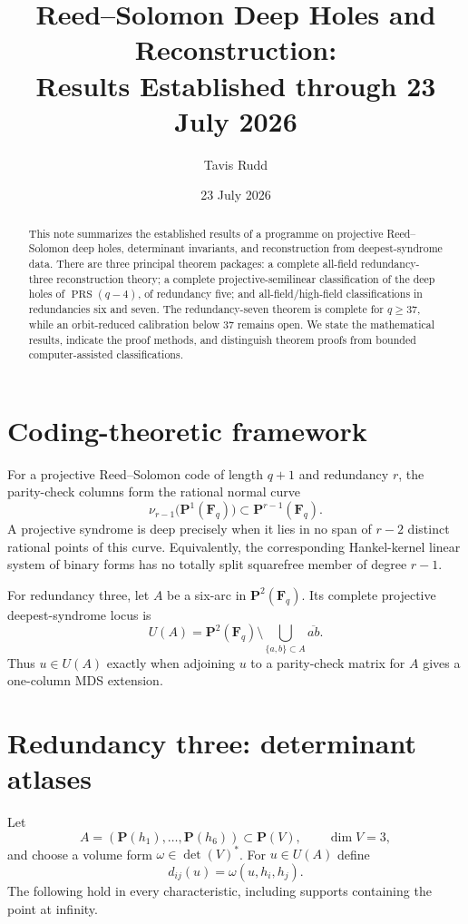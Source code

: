 \documentclass[11pt]{article}
\title{Reed--Solomon Deep Holes and Reconstruction:\\
Results Established through 23 July 2026}
\author{Tavis Rudd}
\date{23 July 2026}
\newcommand{\F}{\mathbf F}
\newcommand{\PRS}{\operatorname{PRS}}
\begin{document}
\maketitle

\begin{abstract}
This note summarizes the established results of a programme on projective
Reed--Solomon deep holes, determinant invariants, and reconstruction from deepest-syndrome
data.  There are three principal theorem packages: a complete all-field
redundancy-three reconstruction theory; a complete projective-semilinear
classification of the deep holes of $\PRS(q-4)$, of redundancy five; and
all-field/high-field classifications in redundancies six and seven.  The
redundancy-seven theorem is complete for $q\geq37$, while an orbit-reduced
calibration below $37$ remains open.  We state the mathematical results,
indicate the proof methods, and distinguish theorem proofs from bounded
computer-assisted classifications.
\end{abstract}

\section{Coding-theoretic framework}

For a projective Reed--Solomon code of length $q+1$ and redundancy $r$, the
parity-check columns form the rational normal curve
\[
 \nu_{r-1}\bigl(\mathbf P^1(\F_q)\bigr)
 \subset \mathbf P^{r-1}(\F_q).
\]
A projective syndrome is deep precisely when it lies in no span of $r-2$
distinct rational points of this curve.  Equivalently, the corresponding
Hankel-kernel linear system of binary forms has no totally split squarefree
member of degree $r-1$.

For redundancy three, let $A$ be a six-arc in $\mathbf P^2(\F_q)$.  Its
complete projective deepest-syndrome locus is
\[
 U(A)=\mathbf P^2(\F_q)\setminus
 \bigcup_{\{a,b\}\subset A}\overline{ab}.
\]
Thus $u\in U(A)$ exactly when adjoining $u$ to a parity-check matrix for
$A$ gives a one-column MDS extension.

\section{Redundancy three: determinant atlases}

Let
\[
 A=(\mathbf P(h_1),\ldots,\mathbf P(h_6))\subset\mathbf P(V),
 \qquad \dim V=3,
\]
and choose a volume form $\omega\in\det(V)^*$.  For $u\in U(A)$ define
\[
 d_{ij}(u)=\omega(u,h_i,h_j).
\]
The following hold in every characteristic, including supports containing
the point at infinity.
\end{document}
